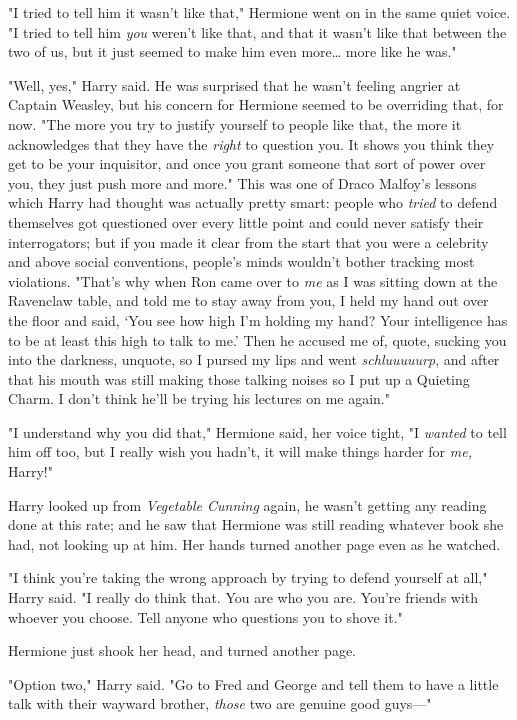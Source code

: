 "I tried to tell him it wasn't like that," Hermione went on in the same quiet
voice. "I tried to tell him \emph{you} weren't like that, and that it wasn't
like that between the two of us, but it just seemed to make him even
more{\ldots} more like he was."

"Well, yes," Harry said. He was surprised that he wasn't feeling angrier at
Captain Weasley, but his concern for Hermione seemed to be overriding that, for
now. "The more you try to justify yourself to people like that, the more it
acknowledges that they have the \emph{right} to question you. It shows you
think they get to be your inquisitor, and once you grant someone that sort of
power over you, they just push more and more." This was one of Draco Malfoy's
lessons which Harry had thought was actually pretty smart: people who
\emph{tried} to defend themselves got questioned over every little point and
could never satisfy their interrogators; but if you made it clear from the
start that you were a celebrity and above social conventions, people's minds
wouldn't bother tracking most violations. "That's why when Ron came over to
\emph{me} as I was sitting down at the Ravenclaw table, and told me to stay
away from you, I held my hand out over the floor and said, `You see how high
I'm holding my hand? Your intelligence has to be at least this high to talk to
me.' Then he accused me of, quote, sucking you into the darkness, unquote, so I
pursed my lips and went \emph{schluuuuurp}, and after that his mouth was still
making those talking noises so I put up a Quieting Charm. I don't think he'll
be trying his lectures on me again."

"I understand why you did that," Hermione said, her voice tight, "I
\emph{wanted} to tell him off too, but I really wish you hadn't, it will make
things harder for \emph{me,} Harry!"

Harry looked up from \emph{Vegetable Cunning} again, he wasn't getting any
reading done at this rate; and he saw that Hermione was still reading whatever
book she had, not looking up at him. Her hands turned another page even as he
watched.

"I think you're taking the wrong approach by trying to defend yourself at all,"
Harry said. "I really do think that. You are who you are. You're friends with
whoever you choose. Tell anyone who questions you to shove it."

Hermione just shook her head, and turned another page.

"Option two," Harry said. "Go to Fred and George and tell them to have a little
talk with their wayward brother, \emph{those} two are genuine good guys---"

